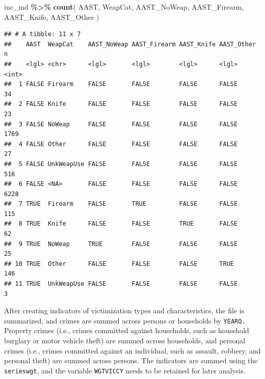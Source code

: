 \documentclass[
]{krantz}
\makeatletter
\newenvironment{Shaded}{\begin{snugshade}}{\end{snugshade}}
\newcommand{\FunctionTok}[1]{\textcolor[rgb]{0.27,0.27,0.27}{\textbf{#1}}}
\newcommand{\NormalTok}[1]{#1}
\newcommand{\SpecialCharTok}[1]{\textcolor[rgb]{0.43,0.43,0.43}{\textbf{#1}}}
\newenvironment{kframe}{%
\medskip{}
\setlength{\fboxsep}{.8em}
 \def\at@end@of@kframe{}%
 \ifinner\ifhmode%
  \def\at@end@of@kframe{\end{minipage}}%
  \begin{minipage}{\columnwidth}%
 \fi\fi%
 \def\FrameCommand##1{\hskip\@totalleftmargin \hskip-\fboxsep
 \colorbox{shadecolor}{##1}\hskip-\fboxsep
     \hskip-\linewidth \hskip-\@totalleftmargin \hskip\columnwidth}%
 \MakeFramed {\advance\hsize-\width
   \@totalleftmargin\z@ \linewidth\hsize
   \@setminipage}}%
 {\par\unskip\endMakeFramed%
 \at@end@of@kframe}
\renewenvironment{Shaded}{\begin{kframe}}{\end{kframe}}
\makeatother
\begin{document}
\begin{Shaded}
\begin{Highlighting}[]
\NormalTok{inc\_ind }\SpecialCharTok{\%\textgreater{}\%}
  \FunctionTok{count}\NormalTok{(}
\NormalTok{    AAST,}
\NormalTok{    WeapCat,}
\NormalTok{    AAST\_NoWeap,}
\NormalTok{    AAST\_Firearm,}
\NormalTok{    AAST\_Knife,}
\NormalTok{    AAST\_Other}
\NormalTok{  )}
\end{Highlighting}
\end{Shaded}

\begin{verbatim}
## # A tibble: 11 x 7
##    AAST  WeapCat    AAST_NoWeap AAST_Firearm AAST_Knife AAST_Other     n
##    <lgl> <chr>      <lgl>       <lgl>        <lgl>      <lgl>      <int>
##  1 FALSE Firearm    FALSE       FALSE        FALSE      FALSE         34
##  2 FALSE Knife      FALSE       FALSE        FALSE      FALSE         23
##  3 FALSE NoWeap     FALSE       FALSE        FALSE      FALSE       1769
##  4 FALSE Other      FALSE       FALSE        FALSE      FALSE         27
##  5 FALSE UnkWeapUse FALSE       FALSE        FALSE      FALSE        516
##  6 FALSE <NA>       FALSE       FALSE        FALSE      FALSE       6228
##  7 TRUE  Firearm    FALSE       TRUE         FALSE      FALSE        115
##  8 TRUE  Knife      FALSE       FALSE        TRUE       FALSE         62
##  9 TRUE  NoWeap     TRUE        FALSE        FALSE      FALSE         25
## 10 TRUE  Other      FALSE       FALSE        FALSE      TRUE         146
## 11 TRUE  UnkWeapUse FALSE       FALSE        FALSE      FALSE          3
\end{verbatim}

After creating indicators of victimization types and characteristics, the file is summarized, and crimes are summed across persons or households by \texttt{YEARQ.} Property crimes (i.e., crimes committed against households, such as household burglary or motor vehicle theft) are summed across households, and personal crimes (i.e., crimes committed against an individual, such as assault, robbery, and personal theft) are summed across persons. The indicators are summed using the \texttt{serieswgt}, and the variable \texttt{WGTVICCY} needs to be retained for later analysis.
\end{document}
